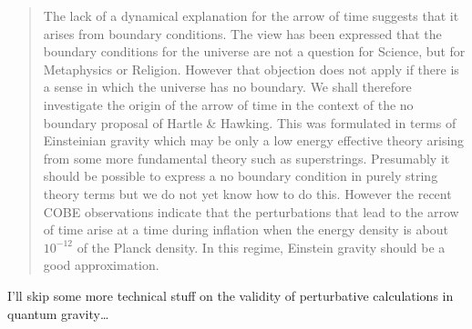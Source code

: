 \documentclass{article}
\begin{document}
\begin{quote}
The lack of a dynamical explanation for the arrow of time suggests that
it arises from boundary conditions. The view has been expressed that the
boundary conditions for the universe are not a question for Science, but
for Metaphysics or Religion. However that objection does not apply if
there is a sense in which the universe has no boundary. We shall
therefore investigate the origin of the arrow of time in the context of
the no boundary proposal of Hartle \& Hawking. This was formulated in
terms of Einsteinian gravity which may be only a low energy effective
theory arising from some more fundamental theory such as superstrings.
Presumably it should be possible to express a no boundary condition in
purely string theory terms but we do not yet know how to do this.
However the recent COBE observations indicate that the perturbations
that lead to the arrow of time arise at a time during inflation when the
energy density is about \(10^{-12}\) of the Planck density. In this
regime, Einstein gravity should be a good approximation.

\end{quote}

\noindent
I'll skip some more technical stuff on the validity of perturbative
calculations in quantum gravity\ldots
\end{document}
